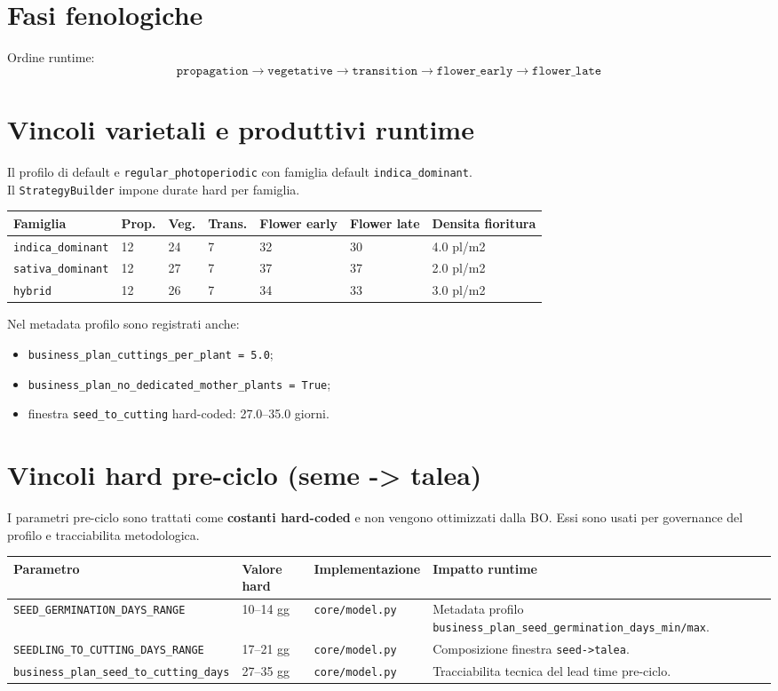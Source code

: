 ﻿\documentclass[11pt,a4paper]{report}
\begin{document}
\section{Fasi fenologiche}
Ordine runtime:
\[
\texttt{propagation} \rightarrow \texttt{vegetative} \rightarrow \texttt{transition} \rightarrow \texttt{flower\_early} \rightarrow \texttt{flower\_late}
\]

\section{Vincoli varietali e produttivi runtime}
Il profilo di default e \texttt{regular\_photoperiodic} con famiglia default \texttt{indica\_dominant}.\\
Il \texttt{StrategyBuilder} impone durate hard per famiglia.

\begin{longtable}{@{}p{3.2cm}p{1.5cm}p{1.5cm}p{1.5cm}p{1.7cm}p{1.5cm}p{2.2cm}@{}}
\toprule
Famiglia & Prop. & Veg. & Trans. & Flower early & Flower late & Densita fioritura \\ \midrule
\texttt{indica\_dominant} & 12 & 24 & 7 & 32 & 30 & 4.0 pl/m2 \\
\texttt{sativa\_dominant} & 12 & 27 & 7 & 37 & 37 & 2.0 pl/m2 \\
\texttt{hybrid} & 12 & 26 & 7 & 34 & 33 & 3.0 pl/m2 \\
\bottomrule
\end{longtable}

Nel metadata profilo sono registrati anche:
\begin{itemize}
  \item \texttt{business\_plan\_cuttings\_per\_plant = 5.0};
  \item \texttt{business\_plan\_no\_dedicated\_mother\_plants = True};
  \item finestra \texttt{seed\_to\_cutting} hard-coded: 27.0--35.0 giorni.
\end{itemize}

\section{Vincoli hard pre-ciclo (seme -> talea)}
I parametri pre-ciclo sono trattati come \textbf{costanti hard-coded} e non vengono ottimizzati dalla BO.
Essi sono usati per governance del profilo e tracciabilita metodologica.

\begin{longtable}{@{}p{4.2cm}p{2.0cm}p{3.2cm}p{4.0cm}@{}}
\toprule
Parametro & Valore hard & Implementazione & Impatto runtime \\ \midrule
\texttt{SEED\_GERMINATION\_DAYS\_RANGE} & 10--14 gg & \texttt{core/model.py} & Metadata profilo \texttt{business\_plan\_seed\_germination\_days\_min/max}. \\
\texttt{SEEDLING\_TO\_CUTTING\_DAYS\_RANGE} & 17--21 gg & \texttt{core/model.py} & Composizione finestra \texttt{seed->talea}. \\
\texttt{business\_plan\_seed\_to\_cutting\_days} & 27--35 gg & \texttt{core/model.py} & Tracciabilita tecnica del lead time pre-ciclo. \\
\bottomrule
\end{longtable}
\end{document}
